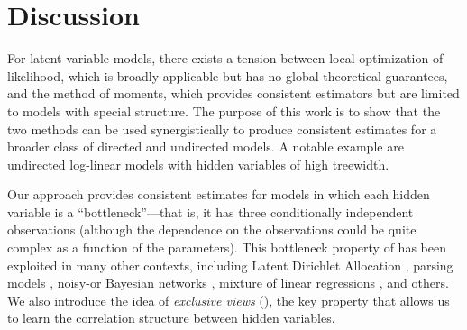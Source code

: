 \section{Discussion}
\label{sec:discussion}

For latent-variable models,
there exists a tension between
local optimization of likelihood,
which is broadly applicable but has no global theoretical guarantees,
and the method of moments, which provides consistent estimators
but are limited to models with special structure.
The purpose of this work is to show that the two methods
can be used synergistically to produce consistent estimates
for a broader class of directed and undirected models.
A notable example are undirected log-linear models with hidden variables of
high treewidth.


Our approach provides consistent estimates for
models in which each hidden variable is a ``bottleneck''---that is,
it has three conditionally independent observations
(although the dependence on the observations could be quite complex as a function of the parameters).
This bottleneck property of \citet{anandkumar13tensor}
has been exploited in many other contexts,
including Latent Dirichlet Allocation \cite{anandkumar12lda},
parsing models \cite{hsu12identifiability},
noisy-or Bayesian networks \cite{halpern2013unsupervised},
mixture of linear regressions \cite{chaganty13regression},
and others.
We also introduce the idea of \emph{exclusive views} (),
the key property that allows us to learn the correlation structure between hidden variables.



